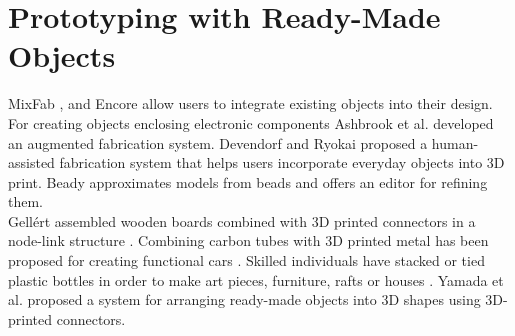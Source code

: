 \section{Prototyping with Ready-Made Objects}
MixFab \cite{weichel:2014}, and Encore \cite{chen:2015} allow users to integrate existing objects into their design. For creating objects enclosing electronic components Ashbrook et al. \cite{ashbrook:2016} developed an augmented fabrication system. Devendorf and Ryokai \cite{devendorf:2015} proposed a human-assisted fabrication system that helps users incorporate everyday objects into 3D print. Beady \cite{igarashi:2012} approximates models from beads and offers an editor for refining them.\\
Gellért assembled wooden boards combined with 3D printed connectors in a node-link structure \cite{gellert}. Combining carbon tubes with 3D printed metal has been proposed for creating functional cars \cite{divergent}.
Skilled individuals have stacked or tied plastic bottles in order to make art pieces, furniture, rafts or houses \cite{plasticbottles}. Yamada et al. \cite{yamada:2016} proposed a system for arranging ready-made objects into 3D shapes using 3D-printed connectors.


